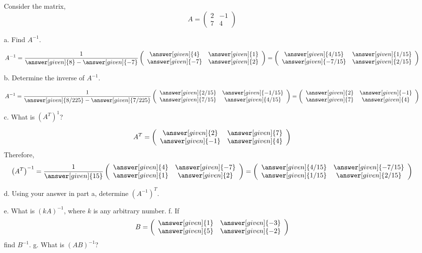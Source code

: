 \documentclass{ximera}
\begin{document}
\begin{example}\label{example1}
Consider the matrix,
\[A= \left(\begin{array}{cc}
  2 &  -1  \\
   7&  4 
\end{array}\right)\]

a. Find $A^{-1}$. 
\begin{prompt}
\[A^{-1}= \frac{1}{\answer[given]{8}- \answer[given]{-7}}\left(\begin{array}{cc}
  \answer[given]{4} &  \answer[given]{1}  \\
   \answer[given]{-7}&  \answer[given]{2}
\end{array}\right)= \left(\begin{array}{cc}
  \answer[given]{4/15} &  \answer[given]{1/15}  \\
   \answer[given]{-7/15}&  \answer[given]{2/15}
\end{array}\right)
\]
\end{prompt}
b. Determine the inverse of $A^{-1}$. 
\begin{prompt}
\[A^{-1}= \frac{1}{\answer[given]{8/225}- \answer[given]{7/225}}\left(\begin{array}{cc}
  \answer[given]{2/15} &  \answer[given]{-1/15}  \\
   \answer[given]{7/15}&  \answer[given]{4/15}
\end{array}\right)= \left(\begin{array}{cc}
  \answer[given]{2} &  \answer[given]{-1}  \\
   \answer[given]{7}&  \answer[given]{4}
\end{array}\right)
\]
\end{prompt}
c. What is $\left(A^{T}\right)^{1}$?
\begin{prompt}
\[A^{T}= \left(\begin{array}{cc}
  \answer[given]{2} &  \answer[given]{7}  \\
   \answer[given]{-1}&  \answer[given]{4}
\end{array}\right)
\]
Therefore,
\[\left(A^{T}\right)^{-1}= \frac{1}{\answer[given]{15}}\left(\begin{array}{cc}
  \answer[given]{4} &  \answer[given]{-7}  \\
   \answer[given]{1}&  \answer[given]{2}
\end{array}\right) = \left(\begin{array}{cc}
  \answer[given]{4/15} &  \answer[given]{-7/15}  \\
   \answer[given]{1/15}&  \answer[given]{2/15}
\end{array}\right) \]
\end{prompt}
d. Using your answer in part a, determine $\left(A^{-1}\right)^{T}$.

e. What is $(kA)^{-1}$, where $k$ is any arbitrary number. 
f. If 
\[B= \left(\begin{array}{cc}
  \answer[given]{1} &  \answer[given]{-3}  \\
   \answer[given]{5}&  \answer[given]{-2}
\end{array}\right)
\]
find $B^{-1}$. 
g. What is $(AB)^{-1}$? 
\end{example}
\end{document}
